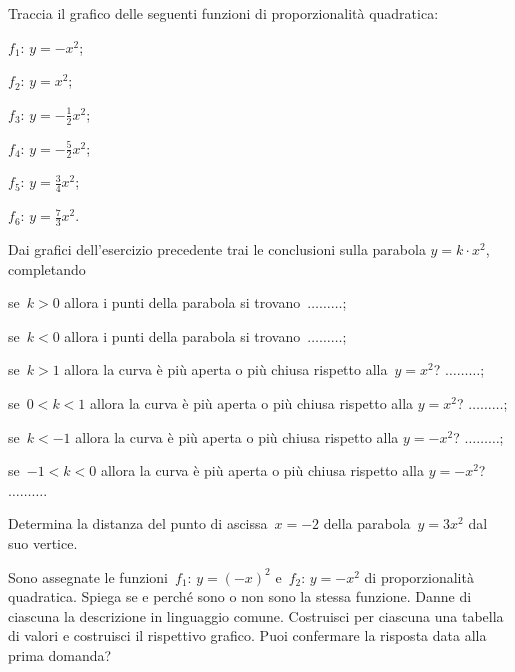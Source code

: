 \begin{esercizio}
\label{ese:\thechapter.55}
Traccia il grafico delle seguenti funzioni di proporzionalità quadratica:
\begin{multicols}{3}
 \begin{enumeratea}
\item $f_{1}:\, y=-x^{2}$;
\item $f_{2}:\, y=x^{2}$;
\item $f_{3}:\, y=-{\frac{1}{2}}x^{2}$;
\item $f_{4}:\, y=-{\frac{5}{2}}x^{2}$;
\item $f_{5}:\, y=\frac{3}{4}x^{2}$;
\item $f_{6}:\, y=\frac{7}{3}x^{2}$.
\end{enumeratea}
\end{multicols}
\end{esercizio}
\pagebreak
\begin{esercizio}
\label{ese:\thechapter.56}
Dai grafici dell'esercizio precedente trai le conclusioni sulla parabola $y=k\cdot x^2$, completando

\begin{enumeratea}
\item se~$k>0$ allora i punti della parabola si trovano~$\ldots \ldots \ldots$;
\item se~$k<0$ allora i punti della parabola si trovano~$\ldots \ldots \ldots$;
\item se~$k>1$ allora la curva è più aperta o più chiusa rispetto alla~$y=x^{2}$? $\ldots \ldots \ldots$;
\item se~$0<k<1$ allora la curva è più aperta o più chiusa rispetto alla  $y=x^{2}$? $\ldots \ldots \ldots$;
\item se~$k<-1$ allora la curva è più aperta o più chiusa rispetto alla  $y=-x^{2}$? $\ldots \ldots \ldots$;
\item se~$-1<k<0$ allora la curva è più aperta o più chiusa rispetto alla  $y=-x^{2}$? $\ldots \ldots \ldots$.
\end{enumeratea}
\end{esercizio}

\begin{esercizio}
\label{ese:\thechapter.57}
Determina la distanza del punto di ascissa~$x=-2$ della parabola~$y=3x^{2}$ dal suo vertice.
\end{esercizio}

\begin{esercizio}
\label{ese:\thechapter.58}
Sono assegnate le funzioni~$f_{1}:\, y=(-x)^{2}$ e~$f_{2}:\, y=-x^{2}$ di proporzionalità quadratica.
Spiega se e perché sono o non sono la stessa funzione.
Danne di ciascuna la descrizione in linguaggio comune.
Costruisci per ciascuna una tabella di valori e costruisci il rispettivo grafico.
Puoi confermare la risposta data alla prima domanda?
\end{esercizio}

